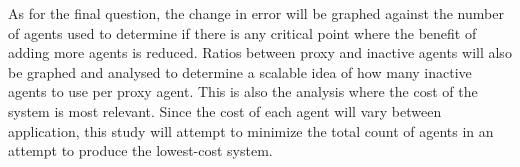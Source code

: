 As for the final question, the change in error will be graphed against the
number of agents used to determine if there is any critical point where the benefit
of adding more agents is reduced.
Ratios between proxy and inactive agents will also be graphed and analysed to
determine a scalable idea of how many inactive agents to use per proxy agent.
This is also the analysis where the cost of the system is most relevant.
Since the cost of each agent will vary between application, this study will attempt to
minimize the total count of agents in an attempt to produce the lowest-cost system.
